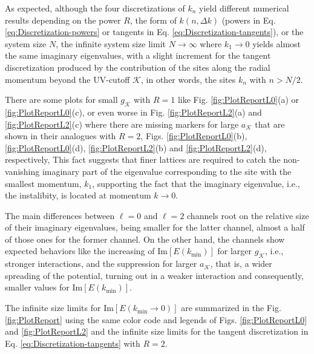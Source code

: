 \documentclass[english,aps,prd,nofootinbib,twocolumn]{revtex4-1}
\begin{document}
As expected, although the four discretizations of $k_{n}$ yield different numerical results depending on the power $R$, the form of $k(n,\Delta k)$ (powers in Eq. \eqref{eq:Discretization-powers} or tangents in Eq. \eqref{eq:Discretization-tangents}), or the system size $N$, the infinite system size limit $N\rightarrow \infty$ where $k_{1}\rightarrow 0$ yields almost the same imaginary eigenvalues, with a slight increment for the tangent discretization produced by the contribution of the sites along the radial momentum beyond the UV-cutoff $\mathcal{K}$, in other words, the sites $k_{n}$ with $n>N/2$.

There are some plots for small $g_{\mathcal{K}}$ with $R=1$ like Fig. \ref{fig:PlotReportL0}(a) or \ref{fig:PlotReportL0}(c), or even worse in Fig. \ref{fig:PlotReportL2}(a) and \ref{fig:PlotReportL2}(c) where there are missing markers for large $a_{\mathcal{K}}$ that are shown in their analogues with $R=2$, Figs. \ref{fig:PlotReportL0}(b), \ref{fig:PlotReportL0}(d), \ref{fig:PlotReportL2}(b) and \ref{fig:PlotReportL2}(d), respectively, This fact suggests that finer lattices are required to catch the non-vanishing imaginary part of the eigenvalue corresponding to the site with the smallest momentum, $k_{1}$, supporting the fact that the imaginary eigenvalue, i.e., the instalibity, is located at momentum $k\rightarrow 0$.

The main differences between $\ell=0$ and $\ell=2$ channels root on the relative size of their imaginary eigenvalues, being smaller for the latter channel, almost a half of those ones for the former channel. On the other hand, the channels show expected behaviors like the increasing of $\mathrm{Im}[E(k_{\mathrm{min}})]$ for larger $g_{\mathcal{K}}$, i.e., stronger interactions, and the suppression for larger $a_{\mathcal{K}}$, that is, a wider spreading of the potential, turning out in a weaker interaction and consequently, smaller values for $\mathrm{Im}[E(k_{\mathrm{min}})]$.

The infinite size limits for $\mathrm{Im}[E(k_{\mathrm{min}}\rightarrow 0)]$ are summarized in the Fig. \ref{fig:PlotReport} using the same color code and legends of Figs. \ref{fig:PlotReportL0} and \ref{fig:PlotReportL2} and the infinite size limits for the tangent discretization in Eq. \eqref{eq:Discretization-tangents} with $R=2$. 
\end{document}
